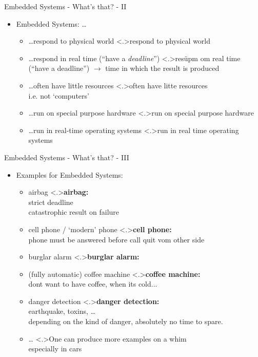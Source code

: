 \documentclass[ngerman={babel}, utf8, bigger, t, xcolor={table,dvipsnames}, ompress, hyperref={bookmarks,colorlinks},red]{beamer}
\begin{document}
\begin{frame}{Embedded Systems - What's that? - II}
	\begin{itemize}
		\item Embedded Systems: \dots
		\begin{itemize}
			\item \dots respond to physical world
			\note<.>{respond to physical world}
			\item \dots respond in real time (``have a \emph{deadline}'')
			\note<.>{resüpm om real time \\
			(``have a deadline'') $\to$ time in which the result is produced}
			\item \dots often have little resources
			\note<.>{often have litte resources \\ i.e. not `computers'}
			\item \dots run on special purpose hardware
			\note<.>{run on special purpose hardware}
			\item \dots run in real-time operating systems
			\note<.>{run in real time operating systems}
		\end{itemize}
	\end{itemize}
\end{frame}

\begin{frame}{Embedded Systems - What's that? - III}
	\begin{itemize}
		\item Examples for Embedded Systems:
		\begin{itemize}
			\item airbag
			\note<.>{\textbf{airbag:}\\ strict deadline \\ catastrophic result on failure}
			\item cell phone / `modern' phone
			\note<.>{\textbf{cell phone:}\\ phone must be answered before call quit vom other side}
			\item burglar alarm
			\note<.>{\textbf{burglar alarm:}\\ }
			\item (fully automatic) coffee machine
			\note<.>{\textbf{coffee machine:}\\ dont want to have coffee, when its cold...}
			\item danger detection %
			\note<.>{\textbf{danger detection:} \\ earthquake, toxins, \dots \\ depending on the kind of danger, absolutely no time to spare.}
			\item \dots
			\note<.>{One can produce more examples on a whim \\ especially in cars}
		\end{itemize}
	\end{itemize}
\end{frame}
\end{document}

